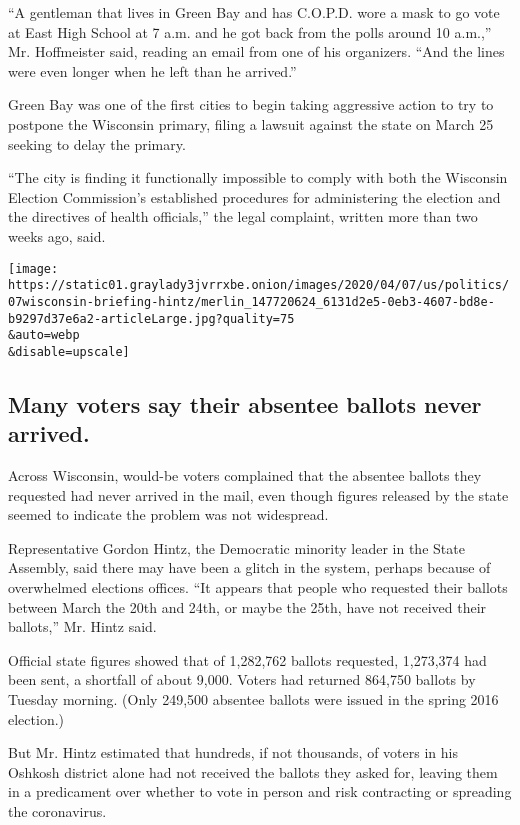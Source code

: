 ``A gentleman that lives in Green Bay and has C.O.P.D. wore a mask to go
vote at East High School at 7 a.m. and he got back from the polls around
10 a.m.,'' Mr. Hoffmeister said, reading an email from one of his
organizers. ``And the lines were even longer when he left than he
arrived.''

Green Bay was one of the first cities to begin taking aggressive action
to try to postpone the Wisconsin primary, filing a lawsuit against the
state on March 25 seeking to delay the primary.

``The city is finding it functionally impossible to comply with both the
Wisconsin Election Commission's established procedures for administering
the election and the directives of health officials,'' the legal
complaint, written more than two weeks ago, said.

\texttt{[image: https://static01.graylady3jvrrxbe.onion/images/2020/04/07/us/politics/07wisconsin-briefing-hintz/merlin\_147720624\_6131d2e5-0eb3-4607-bd8e-b9297d37e6a2-articleLarge.jpg?quality=75\\\&auto=webp\\\&disable=upscale]}

\hypertarget{many-voters-say-their-absentee-ballots-never-arrived}{%
\subsection{Many voters say their absentee ballots never
arrived.}\label{many-voters-say-their-absentee-ballots-never-arrived}}

Across Wisconsin, would-be voters complained that the absentee ballots
they requested had never arrived in the mail, even though figures
released by the state seemed to indicate the problem was not widespread.

Representative Gordon Hintz, the Democratic minority leader in the State
Assembly, said there may have been a glitch in the system, perhaps
because of overwhelmed elections offices. ``It appears that people who
requested their ballots between March the 20th and 24th, or maybe the
25th, have not received their ballots,'' Mr. Hintz said.

Official state figures showed that of 1,282,762 ballots requested,
1,273,374 had been sent, a shortfall of about 9,000. Voters had returned
864,750 ballots by Tuesday morning. (Only 249,500 absentee ballots were
issued in the spring 2016 election.)

But Mr. Hintz estimated that hundreds, if not thousands, of voters in
his Oshkosh district alone had not received the ballots they asked for,
leaving them in a predicament over whether to vote in person and risk
contracting or spreading the coronavirus.

